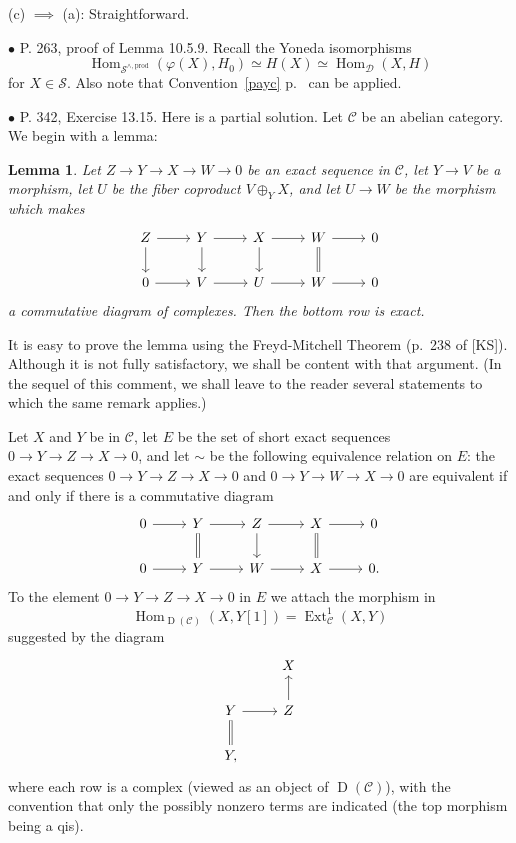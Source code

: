 \documentclass[12pt]{article}
\newtheorem{lem}[thm]{Lemma}
\theoremstyle{remark}%
\newcommand{\bu}{\bullet}
\newcommand{\n}{\noindent}
\newcommand{\cc}{\mathcal}
\newcommand{\C}{\mathcal C}
\newcommand{\oo}{\operatorname}
\newcommand{\p}{\varphi}
\DeclareMathOperator{\h}{Hom}
\begin{document}
\n(c) $\implies$ (a): Straightforward.


\n$\bu$ P. 263, proof of Lemma 10.5.9. Recall the Yoneda isomorphisms 
$$
\h_{\cc S^{\wedge,\text{prod}}}(\p(X),H_0)\simeq H(X)\simeq\h_{\cc D}(X,H)
$$ 
for $X\in\cc S$. Also note that Convention~\ref{payc} p.~\pageref{payc} can be applied.


\n$\bu$ P. 342, Exercise 13.15. Here is a partial solution. Let $\C$ be an abelian category. We begin with a lemma:

\begin{lem}\label{738}
Let $Z\to Y\to X\to W\to0$ be an exact sequence in $\C$, let $Y\to V$ be a morphism, let $U$ be the fiber coproduct $V\oplus_YX$, and let $U\to W$ be the morphism which makes 
$$
\begin{tikzcd}
Z\ar{d}\ar{r}&Y\ar{d}\ar{r}&X\ar{d}\ar{r}&W\ar[equal]{d}\ar{r}&0\\ 
0\ar{r}&V\ar{r}&U\ar{r}&W\ar{r}&0
\end{tikzcd}
$$ 
a commutative diagram of complexes. Then the bottom row is exact.
\end{lem}

It is easy to prove the lemma using the Freyd-Mitchell Theorem (p.~238 of [KS]). Although it is not fully satisfactory, we shall be content with that argument. (In the sequel of this comment, we shall leave to the reader several statements to which the same remark applies.)

Let $X$ and $Y$ be in $\C$, let $E$ be the set of short exact sequences $0\to Y\to Z\to X\to0$, and let $\sim$ be the following equivalence relation on $E$: the exact sequences $0\to Y\to Z\to X\to0$ and $0\to Y\to W\to X\to0$ are equivalent if and only if there is a commutative diagram 
$$
\begin{tikzcd}
0\ar{r}&Y\ar[equal]{d}\ar{r}&Z\ar{d}\ar{r}&X\ar[equal]{d}\ar{r}&0\\ 
0\ar{r}&Y\ar{r}&W\ar{r}&X\ar{r}&0.
\end{tikzcd}
$$ 
To the element $0\to Y\to Z\to X\to0$ in $E$ we attach the morphism in 
$$
\h_{\oo D(\C)}(X,Y[1])=\oo{Ext}^1_\C(X,Y)
$$ 
suggested by the diagram 
$$
\begin{tikzcd}
{}&X\\ 
Y\ar[equal]{d}\ar{r}&Z\ar{u}\\ 
Y,
\end{tikzcd}
$$ 
where each row is a complex (viewed as an object of $\oo D(\C)$), with the convention that only the possibly nonzero terms are indicated (the top morphism being a qis). 
\end{document}
